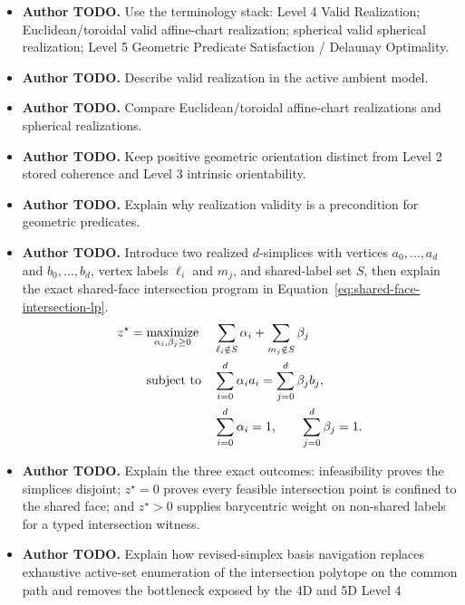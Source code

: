 \documentclass[manuscript,nonacm]{acmart}
\newcommand{\AuthorTodo}[1]{\textbf{Author TODO.} #1}
\begin{document}
\begin{itemize}
  \item \AuthorTodo{Use the terminology stack: Level 4 Valid Realization;
      Euclidean/toroidal valid affine-chart realization; spherical valid
      spherical realization; Level 5 Geometric Predicate Satisfaction / Delaunay
    Optimality.}
  \item \AuthorTodo{Describe valid realization in the active ambient
    model.}
  \item \AuthorTodo{Compare Euclidean/toroidal affine-chart realizations and
    spherical realizations.}
  \item \AuthorTodo{Keep positive geometric orientation distinct from Level 2
    stored coherence and Level 3 intrinsic orientability.}
  \item \AuthorTodo{Explain why realization validity is a precondition for
    geometric predicates.}
  \item \AuthorTodo{Introduce two realized \(d\)-simplices with vertices
      \(a_0,\ldots,a_d\) and \(b_0,\ldots,b_d\), vertex labels
      \(\ell_i\) and \(m_j\), and shared-label set \(S\), then explain the exact
      shared-face intersection program in
    Equation~\ref{eq:shared-face-intersection-lp}.}
    \begin{equation}
      \label{eq:shared-face-intersection-lp}
      \begin{aligned}
        z^\star
        ={}& \underset{\alpha_i,\beta_j \geq 0}{\operatorname{maximize}}
        && \sum_{\ell_i \notin S} \alpha_i
        + \sum_{m_j \notin S} \beta_j \\
        & \text{\rm subject to}
        && \sum_{i=0}^{d} \alpha_i a_i
        = \sum_{j=0}^{d} \beta_j b_j, \\
        &&& \sum_{i=0}^{d} \alpha_i = 1,
        \qquad \sum_{j=0}^{d} \beta_j = 1 .
      \end{aligned}
    \end{equation}
  \item \AuthorTodo{Explain the three exact outcomes: infeasibility proves the
      simplices disjoint; \(z^\star=0\) proves every feasible intersection point
      is confined to the shared face; and \(z^\star>0\) supplies barycentric
    weight on non-shared labels for a typed intersection witness.}
  \item \AuthorTodo{Explain how revised-simplex basis navigation replaces
      exhaustive active-set enumeration of the intersection polytope on the
      common path and removes the bottleneck exposed by the 4D and 5D Level 4
}
\end{itemize}
\end{document}
